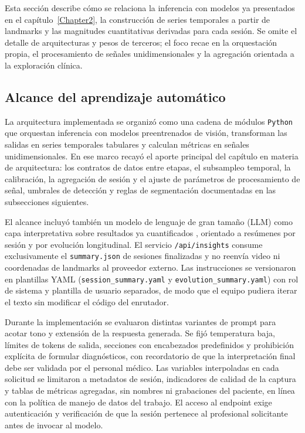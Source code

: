 Esta sección describe cómo se relaciona la inferencia con modelos ya presentados en el capítulo~\ref{Chapter2}, la construcción de series temporales a partir de landmarks y las magnitudes cuantitativas derivadas para cada sesión. Se omite el detalle de arquitecturas y pesos de terceros; el foco recae en la orquestación propia, el procesamiento de señales unidimensionales y la agregación orientada a la exploración clínica.

\subsection{Alcance del aprendizaje automático}

La arquitectura implementada se organizó como una cadena de módulos \texttt{Python} que orquestan inferencia con modelos preentrenados de visión, transforman las salidas en series temporales tabulares y calculan métricas en señales unidimensionales. En ese marco recayó el aporte principal del capítulo en materia de arquitectura: los contratos de datos entre etapas, el subsampleo temporal, la calibración, la agregación de sesión y el ajuste de parámetros de procesamiento de señal, umbrales de detección y reglas de segmentación documentadas en las subsecciones siguientes.

El alcance incluyó también un modelo de lenguaje de gran tamaño (LLM) como capa interpretativa sobre resultados ya cuantificados \citep{openai_api}, orientado a resúmenes por sesión y por evolución longitudinal. El servicio \texttt{/api/\allowbreak{}insights} consume exclusivamente el \texttt{summary.\allowbreak{}json} de sesiones finalizadas y no reenvía video ni coordenadas de landmarks al proveedor externo. Las instrucciones se versionaron en plantillas YAML \citep{yaml_spec} (\texttt{session\_\allowbreak{}summary.yaml} y \texttt{evolution\_\allowbreak{}summary.yaml}) con rol de sistema y plantilla de usuario separados, de modo que el equipo pudiera iterar el texto sin modificar el código del enrutador.

Durante la implementación se evaluaron distintas variantes de prompt para acotar tono y extensión de la respuesta generada. Se fijó temperatura baja, límites de tokens de salida, secciones con encabezados predefinidos y prohibición explícita de formular diagnósticos, con recordatorio de que la interpretación final debe ser validada por el personal médico. Las variables interpoladas en cada solicitud se limitaron a metadatos de sesión, indicadores de calidad de la captura y tablas de métricas agregadas, sin nombres ni grabaciones del paciente, en línea con la política de manejo de datos del trabajo. El acceso al endpoint exige autenticación y verificación de que la sesión pertenece al profesional solicitante antes de invocar al modelo.

